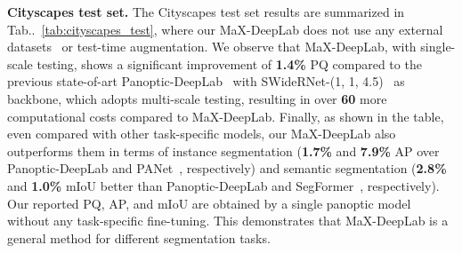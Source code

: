 \documentclass[runningheads]{llncs}
\makeatletter
\DeclareRobustCommand\onedot{\futurelet\@let@token\@onedot}
\def\@onedot{\ifx\@let@token.\else.\null\fi\xspace}
\newcommand{\tabref}[1]{Tab\onedot~\ref{#1}}
\makeatother
\begin{document}
\textbf{Cityscapes test set.}\quad
The Cityscapes test set results are summarized in \tabref{tab:cityscapes_test}, where our MaX-DeepLab does not use any external datasets~\cite{neuhold2017mapillary,lin2014microsoft} or test-time augmentation.
We observe that MaX-DeepLab, with single-scale testing, shows a significant improvement of \textbf{1.4\%} PQ compared to the previous state-of-art Panoptic-DeepLab~\cite{cheng2019panoptic} with SWideRNet-(1, 1, 4.5)~\cite{swidernet_2020} as backbone, which adopts multi-scale testing, resulting in over \textbf{60} more computational costs compared to MaX-DeepLab. Finally, as shown in the table, even compared with other task-specific models, our MaX-DeepLab also outperforms them in terms of instance segmentation (\textbf{1.7\%} and \textbf{7.9\%} AP over Panoptic-DeepLab and PANet~\cite{liu2018path}, respectively) and semantic segmentation (\textbf{2.8\%} and \textbf{1.0\%} mIoU better than Panoptic-DeepLab and SegFormer~\cite{xie2021segformer}, respectively).
Our reported PQ, AP, and mIoU are obtained by a single panoptic model without any task-specific fine-tuning.
This demonstrates that MaX-DeepLab is a general method for different segmentation tasks.
\end{document}
